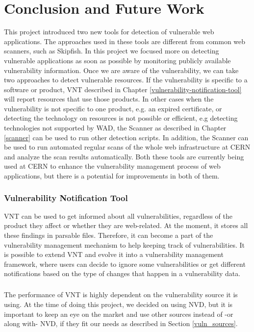 \chapter{Conclusion and Future Work}
\label{conclusion-and-future-work}
\thispagestyle{empty}
This project introduced two new tools for detection of vulnerable web applications. The approaches used in these tools are different from common web scanners, such as Skipfish. In this project we focused more on detecting vulnerable applications as soon as possible by monitoring publicly available vulnerability information. Once we are aware of the vulnerability, we can take two approaches to detect vulnerable resources. If the vulnerability is specific to a software or product, VNT described in Chapter \ref{vulnerability-notification-tool} will report resources that use those products. In other cases when the vulnerability is not specific to one product, e.g. an expired certificate, or detecting the technology on resources is not possible or efficient, e.g detecting technologies not supported by WAD, the Scanner as described in Chapter \ref{scanner} can be used to run other detection scripts. In addition, the Scanner can be used to run automated regular scans of the whole web infrastructure at CERN and analyze the scan results automatically. Both these tools are currently being used at CERN to enhance the vulnerability management process of web applications, but there is a potential for improvements in both of them. 
 
\subsection{Vulnerability Notification Tool}
VNT can be used to get informed about all vulnerabilities, regardless of the product they affect or whether they are web-related. At the moment, it stores all these findings in parsable files. Therefore, it can become a part of the vulnerability management mechanism to help keeping track of vulnerabilities. It is possible to extend VNT and evolve it into a vulnerability management framework, where users can decide to ignore some vulnerabilities or get different notifications based on the type of changes that happen in a vulnerability data.
\paragraph{}
The performance of VNT is highly dependent on the vulnerability source it is using. At the time of doing this project, we decided on using NVD,  but it is important to keep an eye on the market and use other sources instead of -or along with- NVD, if they fit our needs as described in Section \ref{vuln_sources}. 

